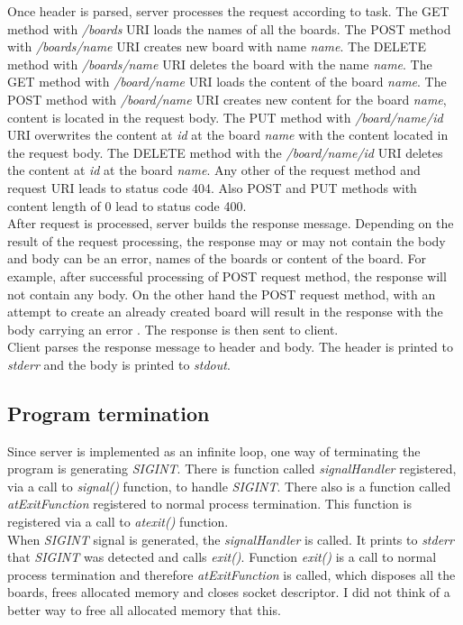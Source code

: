 \documentclass[11pt, a4paper]{article}
\begin{document}
	Once header is parsed, server processes the request according to task. The GET method with \textit{/boards} URI loads the names of all the boards. The POST method 		with \textit{/boards/name} URI creates new board with name \textit{name}. The DELETE method with \textit{/boards/name} URI deletes the board with the name 		\textit{name}. The GET method with \textit{/board/name} URI loads the content of the board \textit{name}. The POST method with \textit{/board/name} URI creates new 		content for the board \textit{name}, content is located in the request body. The PUT method with \textit{/board/name/id} URI overwrites	the content at \textit{id} at 		the board \textit{name} with the content located in the request body. The DELETE method with the \textit{/board/name/id} URI deletes the content at \textit{id} at the 		board \textit{name}. Any other of the request method and request URI leads to status code 404. Also POST and PUT methods with content length of 0 lead to status code 
	400. \\
	After request is processed, server builds the response message. Depending on the result of the request processing, the response may or may not contain the body and
	body can be an error, names of the boards or content of the board. For example, after successful processing of POST request method, the response will not contain any
	body. On the other hand the POST request method, with an attempt to create an already created board will result in the response with the body carrying an error 
	. The response is then sent to client. \\
	Client parses the response message to header and body. The header is printed to \textit{stderr} and the body is printed to \textit{stdout}. \\
	\subsection{Program termination}	
	Since server is implemented as an infinite loop, one way of terminating the program is generating \textit{SIGINT}. There is function called \textit{signalHandler} registered, 		via a call to \textit{signal()} function, to handle \textit{SIGINT}. There also is a function called \textit{atExitFunction} registered to normal process termination. This 		function is registered via a call to \textit{atexit()} function. \\
	When \textit{SIGINT} signal is generated, the \textit{signalHandler} is called. It prints to \textit{stderr} that \textit{SIGINT} was detected and calls \textit{exit()}. 
	Function \textit{exit()} is a call to normal process termination and therefore \textit{atExitFunction} is called, which disposes all the boards, frees allocated memory and
	 closes socket descriptor. I did not think of a better way to free all allocated memory that this.
\end{document}
